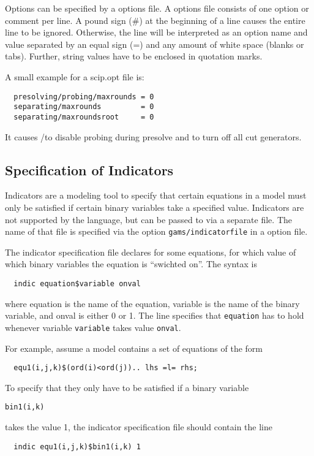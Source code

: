 Options can be specified by a \SCIP options file.
A \SCIP options file consists of one option or comment per line.
A pound sign (\#) at the beginning of a line causes the entire line to be ignored.
Otherwise, the line will be interpreted as an option name and value separated by an equal sign (=) and any amount of white space (blanks or tabs).
Further, string values have to be enclosed in quotation marks.

A small example for a scip.opt file is:
\begin{verbatim}
  presolving/probing/maxrounds = 0
  separating/maxrounds         = 0
  separating/maxroundsroot     = 0
\end{verbatim}
It causes \GAMS/\SCIP to disable probing during presolve and to turn off all cut generators.

\subsection{Specification of Indicators}

Indicators are a modeling tool to specify that certain equations in a model must only be satisfied if certain binary variables take a specified value.
Indicators are not supported by the \GAMS language, but can be passed to \SCIP via a separate file.
The name of that file is specified via the option \texttt{gams/indicatorfile} in a \SCIP option file.

The indicator specification file declares for some equations, for which value of which binary variables the equation is ``swichted on''. The syntax is
\begin{verbatim}
  indic equation$variable onval
\end{verbatim}
where equation is the name of the equation, variable is the name of the binary variable, and onval is either 0 or 1.
The line specifies that \texttt{equation} has to hold whenever variable \texttt{variable} takes value \texttt{onval}.

For example, assume a \GAMS model contains a set of equations of the form
\begin{verbatim}
  equ1(i,j,k)$(ord(i)<ord(j)).. lhs =l= rhs;
\end{verbatim}
To specify that they only have to be satisfied if a binary variable
\begin{verbatim}
bin1(i,k)
\end{verbatim}
takes the value 1, the indicator specification file should contain the line
\begin{verbatim}
  indic equ1(i,j,k)$bin1(i,k) 1
\end{verbatim}

